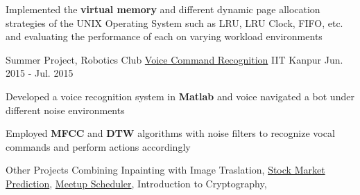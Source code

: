 \begin{cventries}
{\begin{cvitems}
        \item {Implemented the \textbf{virtual memory} and different dynamic page allocation strategies of the UNIX Operating System such as LRU, LRU Clock, FIFO, etc. and evaluating the performance of each on varying workload environments}
      \end{cvitems}
    }
  \cventry
    {Summer Project, Robotics Club}
    {\href{https://bitbucket.org/arhamchopra11/voicecommandrecognition}{Voice Command Recognition}}
    {IIT Kanpur}
    {Jun. 2015 - Jul. 2015}
    {
      \begin{cvitems}
      \item {Developed a voice recognition system in \textbf{Matlab} and voice navigated a bot under different noise environments}
      \item {Employed \textbf{MFCC} and \textbf{DTW} algorithms with noise filters to recognize vocal commands and perform actions accordingly}
      \end{cvitems}
    }
  \cventry
    {Other Projects}
    {}
    {}
    {}
    {
      Combining Inpainting with Image Traslation, 
      \href{https://bitbucket.org/arhamchopra11/stockprediction}{Stock Market Prediction}, 
      \href{https://bitbucket.org/arhamchopra11/meetupscheduler}{Meetup Scheduler}, 
      Introduction to Cryptography, 
    }
\end{cventries}
